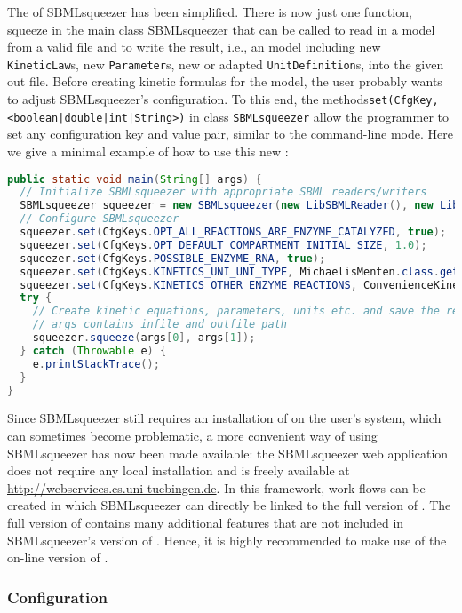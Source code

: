 The \API of SBMLsqueezer has been simplified.
There is now just one function, squeeze in the main class SBMLsqueezer that can
be called to read in a model from a valid \SBML file and to write the result,
i.e., an \SBML model including new \texttt{KineticLaw}s, new \texttt{Parameter}s, new or adapted
\texttt{UnitDefinition}s, into the given out file. Before creating kinetic formulas for
the model, the user probably wants to adjust SBMLsqueezer's configuration.
To this end, the methods\texttt{set(CfgKey, <boolean|double|int|String>)} in class
\texttt{SBMLsqueezer} allow the programmer to set any configuration key and value pair,
similar to the command-line mode. Here we give a minimal example of how to use
this new \API:
\begin{lstlisting}[language=Java, caption={Usage of SBMLsqueezer 1.3 via its \acs{API}}, label={lst:1.3APIUsage}]
public static void main(String[] args) {
  // Initialize SBMLsqueezer with appropriate SBML readers/writers
  SBMLsqueezer squeezer = new SBMLsqueezer(new LibSBMLReader(), new LibSBMLWriter());
  // Configure SBMLsqueezer
  squeezer.set(CfgKeys.OPT_ALL_REACTIONS_ARE_ENZYME_CATALYZED, true);
  squeezer.set(CfgKeys.OPT_DEFAULT_COMPARTMENT_INITIAL_SIZE, 1.0);
  squeezer.set(CfgKeys.POSSIBLE_ENZYME_RNA, true);
  squeezer.set(CfgKeys.KINETICS_UNI_UNI_TYPE, MichaelisMenten.class.getName());
  squeezer.set(CfgKeys.KINETICS_OTHER_ENZYME_REACTIONS, ConvenienceKinetics.class.getName());
  try {
    // Create kinetic equations, parameters, units etc. and save the result
    // args contains infile and outfile path
    squeezer.squeeze(args[0], args[1]);
  } catch (Throwable e) {
    e.printStackTrace();
  }
}
\end{lstlisting}
Since SBMLsqueezer still requires an installation of \libSBML on the user's
system, which can sometimes become problematic, a more convenient way of using
SBMLsqueezer has now been made available: the SBMLsqueezer web application does
not require any local installation and is freely available at
\url{http://webservices.cs.uni-tuebingen.de}. In this framework, work-flows can
be created in which SBMLsqueezer can directly be linked to the full version of
\SBMLLaTeX. The full version of \SBMLLaTeX contains many additional features
that are not included in SBMLsqueezer's version of \SBMLLaTeX. Hence, it is
highly recommended to make use of the on-line version of \SBMLLaTeX.


\subsubsection{Configuration}

